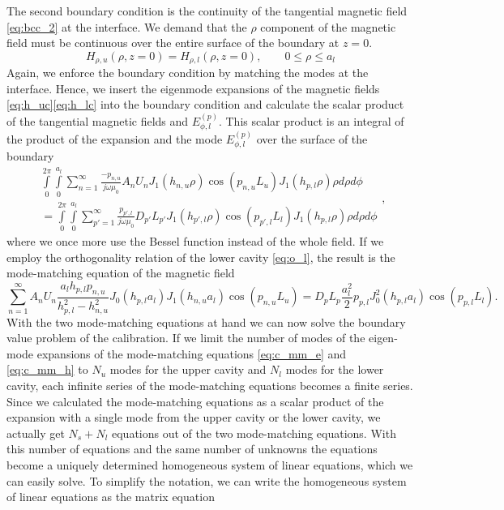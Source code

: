 The second boundary condition is the continuity of the tangential magnetic field \eqref{eq:bcc_2} at the interface. We demand that the $\rho$ component of the magnetic field must be continuous over the entire surface of the boundary at $z=0$.
\begin{equation}\label{eq:bcc_2}
H_{\rho,u}\left(\rho,z=0\right)= H_{\rho,l}\left(\rho,z=0\right),\qquad 0\leq\rho\leq a_l
\end{equation}
Again, we enforce the boundary condition by matching the modes at the interface. Hence, we insert the eigenmode expansions of the magnetic fields \eqref{eq:h_uc}\eqref{eq:h_lc} into the boundary condition and calculate the scalar product of the tangential magnetic fields and $E_{\phi,l}^{(p)}$. This scalar product is an integral of the product of the expansion and the mode $E_{\phi,l}^{(p)}$ over the surface of the boundary
\begin{equation}
\begin{split}
\int\limits_0^{2\pi}\int\limits_0^{a_l}\sum\limits_{n=1}^\infty \frac{-p_{n,u}}{j\omega\mu_0}A_{n}U_{n}J_1(h_{n,u}\rho)\cos(p_{n,u}L_u)J_1(h_{p,l}\rho)\rho\mathit{d\rho d\phi}\\=\int\limits_0^{2\pi}\int\limits_0^{a_l}\sum\limits_{p'=1}^\infty \frac{p_{p',l}}{j\omega\mu_0}D_{p'}L_{p'}J_1(h_{p',l}\rho)\cos(p_{p',l}L_l)J_1(h_{p,l}\rho)\rho\mathit{d\rho d\phi}
\end{split}\text{,}
\end{equation}
where we once more use the Bessel function instead of the whole field. If we employ the orthogonality relation of the lower cavity \eqref{eq:o_l}, the result is the mode-matching equation of the magnetic field
\begin{equation}\label{eq:c_mm_h}
\sum\limits_{n=1}^\infty A_nU_n\frac{a_lh_{p,l}p_{n,u}}{h_{p,l}^2-h_{n,u}^2}J_0(h_{p,l}a_l)J_1(h_{n,u}a_l)\cos(p_{n,u}L_u)=D_pL_p\frac{a_l^2}{2}p_{p,l}J_0^2(h_{p,l}a_l)\cos(p_{p,l}L_l)\text{.}
\end{equation}
With the two mode-matching equations at hand we can now solve the boundary value problem of the calibration. If we limit the number of modes of the eigen-mode expansions of the mode-matching equations \eqref{eq:c_mm_e} and \eqref{eq:c_mm_h} to $N_u$ modes for the upper cavity and $N_l$ modes for the lower cavity, each infinite series of the mode-matching equations becomes a finite series. Since we calculated the mode-matching equations as a scalar product of the expansion with a single mode from the upper cavity or the lower cavity, we actually get $N_s+N_l$ equations out of the two mode-matching equations. With this number of equations and the same number of unknowns the equations become a uniquely determined homogeneous system of linear equations, which we can easily solve. To simplify the notation, we can write the homogeneous system of linear equations as the matrix equation

